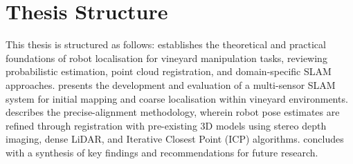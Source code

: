 \section{Thesis Structure}
\label{sec:thesis-structure}

This thesis is structured as follows:
 establishes the theoretical and practical foundations of robot localisation for vineyard manipulation tasks, reviewing probabilistic estimation, point cloud registration, and domain-specific SLAM approaches.
 presents the development and evaluation of a multi-sensor SLAM system for initial mapping and coarse localisation within vineyard environments. 
 describes the precise-alignment methodology, wherein robot pose estimates are refined through registration with pre-existing 3D models using stereo depth imaging, dense LiDAR, and Iterative Closest Point (ICP) algorithms. 
 concludes with a synthesis of key findings and recommendations for future research.

